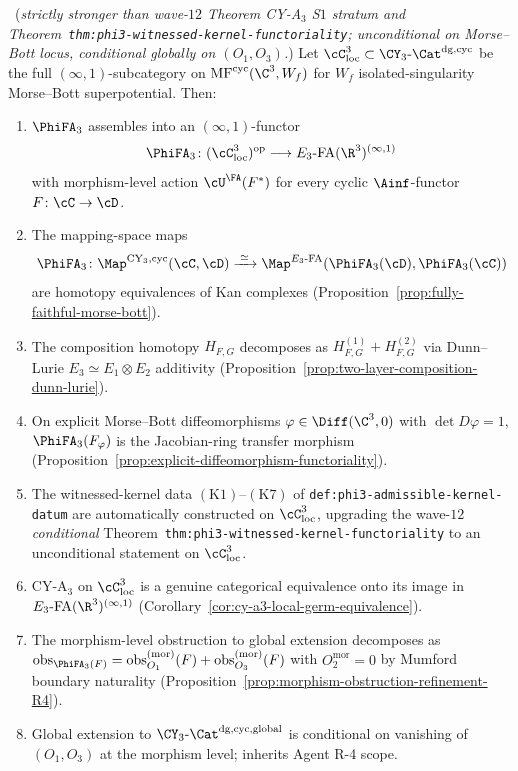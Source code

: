 \begin{theorem}
\label{thm:strictly-stronger-morphism-functoriality}
\ClaimStatusProvedHere\ \textup{(}\emph{strictly stronger than wave-$12$
Theorem CY-A$_3$ S$1$ stratum and Theorem~\texttt{thm:phi3-witnessed-kernel-functoriality};
unconditional on Morse--Bott locus, conditional globally on $(O_1, O_3)$.}\textup{)}
Let $\cC_{\mathrm{loc}}^3 \subset \CY_3\text{-}\Cat^{\mathrm{dg}, \mathrm{cyc}}$
be the full $(\infty,1)$-subcategory on $\mathrm{MF}^{\mathrm{cyc}}(\C^3, W_f)$
for $W_f$ isolated-singularity Morse--Bott superpotential.  Then:
\begin{enumerate}[label=\textup{(\Roman*)}]
 \item $\PhiFA_3$ assembles into an $(\infty,1)$-functor
       \[
        \PhiFA_3 \colon (\cC_{\mathrm{loc}}^3)^{\mathrm{op}} \longrightarrow
        E_3\text{-}\mathrm{FA}(\R^3)^{(\infty,1)}
       \]
       with morphism-level action $\cU^\FA(F^*)$ for every cyclic
       $\Ainf$-functor $F \colon \cC \to \cD$.
 \item The mapping-space maps
       \[
        \PhiFA_3 \colon
        \Map^{\mathrm{CY}_3, \mathrm{cyc}}(\cC, \cD)
        \xrightarrow{\;\simeq\;}
        \Map^{E_3\text{-FA}}(\PhiFA_3(\cD), \PhiFA_3(\cC))
       \]
       are homotopy equivalences of Kan complexes
       (Proposition~\ref{prop:fully-faithful-morse-bott}).
 \item The composition homotopy $H_{F, G}$ decomposes as
       $H^{(1)}_{F, G} + H^{(2)}_{F, G}$ via Dunn--Lurie
       $E_3 \simeq E_1 \otimes E_2$ additivity
       (Proposition~\ref{prop:two-layer-composition-dunn-lurie}).
 \item On explicit Morse--Bott diffeomorphisms
       $\varphi \in \Diff(\C^3, 0)$ with $\det D\varphi = 1$,
       $\PhiFA_3(F_\varphi)$ is the Jacobian-ring transfer morphism
       (Proposition~\ref{prop:explicit-diffeomorphism-functoriality}).
 \item The witnessed-kernel data
       $(\mathrm{K1})$--$(\mathrm{K7})$ of
       \texttt{def:phi3-admissible-kernel-datum} are automatically
       constructed on $\cC_{\mathrm{loc}}^3$, upgrading the
       wave-$12$ \emph{conditional} Theorem~\texttt{thm:phi3-witnessed-kernel-functoriality}
       to an unconditional statement on $\cC_{\mathrm{loc}}^3$.
 \item CY-A$_3$ on $\cC_{\mathrm{loc}}^3$ is a genuine categorical
       equivalence onto its image in $E_3\text{-FA}(\R^3)^{(\infty,1)}$
       (Corollary~\ref{cor:cy-a3-local-germ-equivalence}).
 \item The morphism-level obstruction to global extension decomposes as
       $\mathrm{obs}_{\PhiFA_3(F)} = \mathrm{obs}^{(\text{mor})}_{O_1}(F) +
       \mathrm{obs}^{(\text{mor})}_{O_3}(F)$ with $O_2^{\mathrm{mor}} = 0$
       by Mumford boundary naturality
       (Proposition~\ref{prop:morphism-obstruction-refinement-R4}).
 \item Global extension to $\CY_3\text{-}\Cat^{\mathrm{dg}, \mathrm{cyc}, \mathrm{global}}$
       is conditional on vanishing of $(O_1, O_3)$ at the morphism
       level; inherits Agent R-4 scope.
\end{enumerate}
\end{theorem}

